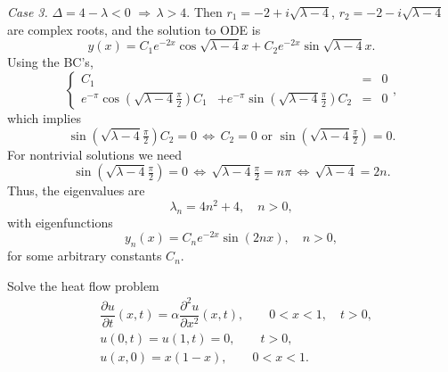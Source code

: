 \documentclass[11pt]{article}
\begin{document}
\begin{solution}
\par \textsl{Case 3.} $\Delta = 4-\lambda <0 \,\, \Rightarrow \, \lambda>4.$ Then $r_{1}=-2+i\sqrt{\lambda-4}$, $r_{2}=-2-i\sqrt{\lambda-4}$ are complex roots, and the solution to ODE is
\[y(x)=C_{1}e^{-2x}\cos\sqrt{\lambda-4}x+C_{2}e^{-2x}\sin\sqrt{\lambda-4}x.\]
Using the BC's,
\begin{equation*}
\left\{\begin{array}{rrcc}
       C_{1} & & = & 0\\
       e^{-\pi}\cos(\sqrt{\lambda-4}\tfrac{\pi}{2})C_{1} &+ e^{-\pi}\sin(\sqrt{\lambda-4}\tfrac{\pi}{2})C_{2}&=&0
      \end{array}\right. ,
\end{equation*}
which implies 
\[\sin(\sqrt{\lambda-4}\tfrac{\pi}{2})C_{2}=0 \,\Leftrightarrow\, C_{2} = 0 \text{ or } \sin(\sqrt{\lambda-4}\tfrac{\pi}{2})=0.\]
For nontrivial solutions we need 
\[\sin(\sqrt{\lambda-4}\tfrac{\pi}{2})=0 \,\Leftrightarrow \, \sqrt{\lambda-4}\tfrac{\pi}{2}=n\pi \,\Leftrightarrow \, \sqrt{\lambda-4}=2n.\] 
Thus, the eigenvalues are
\[\boxed{\lambda_{n}=4n^{2}+4}, \quad n > 0,\]
with eigenfunctions
\[\boxed{y_{n}(x)=C_{n}e^{-2x}\sin(2nx)}, \quad n > 0,\]
for some arbitrary constants $C_{n}$.
\end{solution}




\begin{problem}
Solve the heat flow problem
\begin{equation*} \begin{split}
& \dfrac{\partial u }{\partial t } (x,t) = \alpha \dfrac{\partial^2 u}{\partial x^2}(x,t), \qquad 0<x<1, \quad t>0, \\
& u(0,t) = u(1,t)=0, \qquad t>0, \\
& u(x,0) = x(1-x), \qquad 0<x<1.
\end{split}\end{equation*}
\end{problem}
\end{document}
